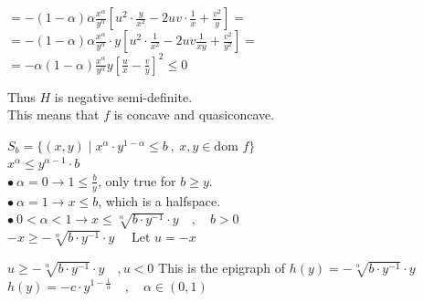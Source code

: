 \documentclass{article}
\begin{document}
\noindent $= -(1-\alpha) \alpha \frac{x^\alpha}{y^\alpha} \left[ u^2 \cdot \frac{y}{x^2} - 2uv \cdot \frac{1}{x} + \frac{v^2}{y} \right] =$ \\[1.5em]

\noindent $= -(1-\alpha) \alpha \frac{x^\alpha}{y^\alpha} \cdot y \left[ u^2 \cdot \frac{1}{x^2} - 2uv \frac{1}{xy} + \frac{v^2}{y^2} \right] =$ \\[1.5em]

\noindent $= -\alpha(1-\alpha) \frac{x^\alpha}{y^\alpha} y \left[ \frac{u}{x} - \frac{v}{y} \right]^2 \leq 0$

\vspace{2em}

\noindent Thus $H$ is negative semi-definite. \\
\noindent This means that $f$ is concave and quasiconcave.





















\medskip \newline
\noindent $S_b = \{ (x, y) \mid x^\alpha \cdot y^{1-\alpha} \leq b \ , \ x, y \in \text{dom } f \}$ \\[1.5em]

\noindent $x^\alpha \leq y^{\alpha-1} \cdot b$ \\[1em]

\noindent $\bullet \ \alpha = 0 \longrightarrow 1 \leq \frac{b}{y}$, only true for $b \geq y$. \\[1em]


\noindent $\bullet \ \alpha = 1 \longrightarrow x \leq b$, which is a halfspace. \\[1em]



\noindent $\bullet \ 0 < \alpha < 1 \longrightarrow x \leq \sqrt[\alpha]{b \cdot y^{-1}} \cdot y \quad , \quad b > 0$ \\[1.5em]

\noindent $ - x \geq -\sqrt[\alpha]{b \cdot y^{-1}} \cdot y \quad $
\noindent Let $u=-x$

\noindent $ u \geq -\sqrt[\alpha]{b \cdot y^{-1}} \cdot y \quad  , u<0$
\noindent This is the epigraph of $h(y) = -\sqrt[\alpha]{b \cdot y^{-1}} \cdot y$ \\[1em]
\indent {} $h(y) = -c \cdot y^{1 - \frac{1}{\alpha}} \quad , \quad \alpha \in (0, 1)$ \\[1.5em]
\end{document}
